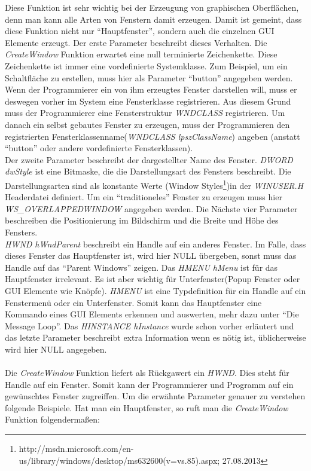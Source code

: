 Diese Funktion ist sehr wichtig bei der Erzeugung von graphischen Oberflächen, denn man kann alle Arten von Fenstern damit erzeugen. Damit ist gemeint, dass diese Funktion  nicht nur "`Hauptfenster"', sondern auch die einzelnen GUI Elemente erzeugt. Der erste Parameter beschreibt dieses Verhalten. Die \textit{CreateWindow} Funktion erwartet eine null terminierte Zeichenkette. Diese Zeichenkette ist immer eine vordefinierte Systemklasse. Zum Beispiel, um ein Schaltfläche zu erstellen, muss hier als Parameter "`button"' angegeben werden. Wenn der Programmierer ein von ihm erzeugtes Fenster darstellen will, muss er deswegen vorher im System eine Fensterklasse registrieren. Aus diesem Grund muss der Programmierer eine Fensterstruktur \textit{WNDCLASS} registrieren. Um danach ein selbst gebautes Fenster zu erzeugen, muss der Programmieren den registrierten Fensterklassenname(\textit{WNDCLASS lpszClassName}) angeben (anstatt "`button"' oder andere vordefinierte Fensterklassen).\\

Der zweite Parameter beschreibt der dargestellter Name des Fenster. \textit{DWORD dwStyle} ist eine Bitmaske, die die Darstellungsart des Fensters beschreibt. Die Darstellungsarten sind als konstante Werte (Window Styles\footnote{http://msdn.microsoft.com/en-us/library/windows/desktop/ms632600(v=vs.85).aspx; 27.08.2013})in der \textit{WINUSER.H} Headerdatei definiert. Um ein "`traditioneles"' Fenster zu erzeugen muss hier \textit{WS\_OVERLAPPEDWINDOW} angegeben werden. Die Nächste vier Parameter beschreiben die Positionierung im Bildschirm und die Breite und Höhe des Fensters.\\ 


\textit{HWND hWndParent} beschreibt ein Handle auf ein anderes Fenster. Im Falle, dass dieses Fenster das Hauptfenster ist, wird hier NULL übergeben, sonst muss das Handle auf das "`Parent Windows"' zeigen. Das \textit{HMENU hMenu} ist für das Hauptfenster irrelevant. Es ist aber wichtig für Unterfenster(Popup Fenster oder GUI Elemente wie Knöpfe). \textit{HMENU} ist eine Typdefinition für ein Handle auf ein Fenstermenü oder ein Unterfenster. Somit kann das Hauptfenster eine Kommando eines GUI Elements erkennen und auswerten, mehr dazu unter "`Die Message Loop"'. Das \textit{HINSTANCE hInstance} wurde schon vorher erläutert und das letzte Parameter beschreibt extra Information wenn es nötig ist, üblicherweise wird hier NULL angegeben.

\paragraph{}
Die \textit{CreateWindow} Funktion liefert als Rückgawert ein \textit{HWND}. Dies steht für Handle auf ein Fenster. Somit kann der Programmierer und Programm auf ein gewünschtes Fenster zugreiffen. Um die erwähnte Parameter genauer zu verstehen folgende Beispiele. Hat man ein Hauptfenster, so ruft man die \textit{CreateWindow} Funktion folgendermaßen:

